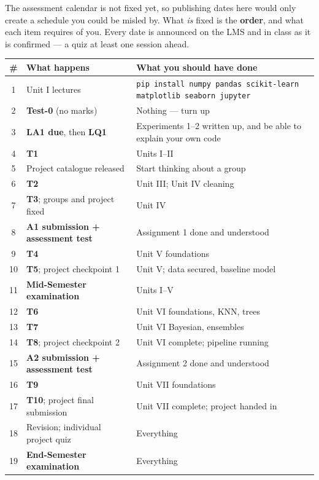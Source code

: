 \documentclass[11pt]{article}
\begin{document}
\begin{caution}
The assessment calendar is not fixed yet, so publishing dates here would only
create a schedule you could be misled by. What \emph{is} fixed is the
\textbf{order}, and what each item requires of you. Every date is announced on
the LMS and in class as it is confirmed --- a quiz at least one session ahead.
\end{caution}

\begin{center}
\begin{tabular}{@{}clp{7.0cm}@{}}
\toprule
\textbf{\#} & \textbf{What happens} & \textbf{What you should have done}\\
\midrule
1 & Unit I lectures & \texttt{pip install numpy pandas scikit-learn matplotlib seaborn jupyter}\\
2 & \textbf{Test-0} (no marks) & Nothing --- turn up\\
3 & \textbf{LA1 due}, then \textbf{LQ1} & Experiments 1--2 written up, and be able to explain your own code\\
4 & \textbf{T1} & Units I--II\\
5 & Project catalogue released & Start thinking about a group\\
6 & \textbf{T2} & Unit III; Unit IV cleaning\\
7 & \textbf{T3}; groups and project fixed & Unit IV\\
8 & \textbf{A1 submission + assessment test} & Assignment 1 done and understood\\
9 & \textbf{T4} & Unit V foundations\\
10 & \textbf{T5}; project checkpoint 1 & Unit V; data secured, baseline model\\
11 & \textbf{Mid-Semester examination} & Units I--V\\
12 & \textbf{T6} & Unit VI foundations, KNN, trees\\
13 & \textbf{T7} & Unit VI Bayesian, ensembles\\
14 & \textbf{T8}; project checkpoint 2 & Unit VI complete; pipeline running\\
15 & \textbf{A2 submission + assessment test} & Assignment 2 done and understood\\
16 & \textbf{T9} & Unit VII foundations\\
17 & \textbf{T10}; project final submission & Unit VII complete; project handed in\\
18 & Revision; individual project quiz & Everything\\
19 & \textbf{End-Semester examination} & Everything\\
\bottomrule
\end{tabular}
\end{center}
\end{document}
